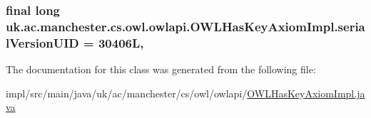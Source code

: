 \hypertarget{classuk_1_1ac_1_1manchester_1_1cs_1_1owl_1_1owlapi_1_1_o_w_l_has_key_axiom_impl_aa7b89a8b031f5c749fa541aae7bd14c3}{
\subsubsection[{serial\-Version\-U\-I\-D}]{\setlength{\rightskip}{0pt plus 5cm}final long uk.\-ac.\-manchester.\-cs.\-owl.\-owlapi.\-O\-W\-L\-Has\-Key\-Axiom\-Impl.\-serial\-Version\-U\-I\-D = 30406\-L\hspace{0.3cm}{\ttfamily [static]}, {\ttfamily [private]}}}\label{classuk_1_1ac_1_1manchester_1_1cs_1_1owl_1_1owlapi_1_1_o_w_l_has_key_axiom_impl_aa7b89a8b031f5c749fa541aae7bd14c3}


The documentation for this class was generated from the following file\-:\begin{DoxyCompactItemize}
\item 
impl/src/main/java/uk/ac/manchester/cs/owl/owlapi/\hyperlink{_o_w_l_has_key_axiom_impl_8java}{O\-W\-L\-Has\-Key\-Axiom\-Impl.\-java}\end{DoxyCompactItemize}
